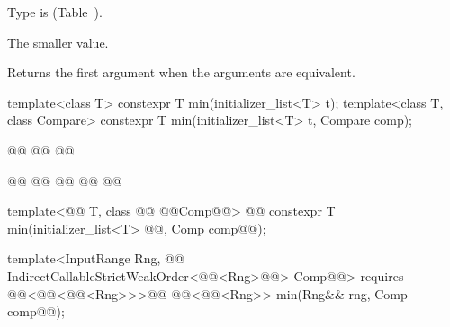 \begin{itemdescr}
\begin{removedblock}
\pnum
\requires
Type
is
 (Table~).
\end{removedblock}

\pnum
\returns
The smaller value.

\pnum
\notes
Returns the first argument when the arguments are equivalent.
\end{itemdescr}

%
\begin{removedblock}
\begin{itemdecl}
template<class T>
  constexpr T min(initializer_list<T> t);
template<class T, class Compare>
  constexpr T min(initializer_list<T> t, Compare comp);
\end{itemdecl}
\end{removedblock}
\begin{addedblock}
\begin{itemdecl}
@@
  @@
  @@

@@
  @@
    @@
  @@
    @@

template<@@ T, class @@
    @@Comp@@>
  @@
  constexpr T min(initializer_list<T> @@, Comp comp@@);

template<InputRange Rng, @@
    IndirectCallableStrictWeakOrder<@@<Rng>@@> Comp@@>
  requires @@<@@<@@<Rng>>>@\newtxt{()}@
  @@<@@<Rng>>
    min(Rng&& rng, Comp comp@@);
\end{itemdecl}
\end{addedblock}


